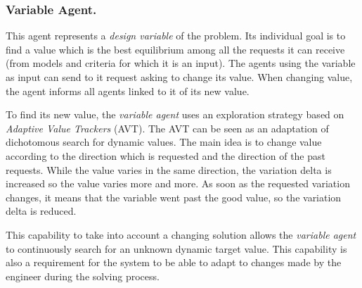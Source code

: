 \subsubsection*{Variable Agent.}

This agent represents a \emph{design variable} of the problem. Its individual goal is to find a value which is the best equilibrium among all the requests it can receive (from models and criteria for which it is an input). The agents using the variable as input can send to it request asking to change its value. When changing value, the agent informs all agents linked to it of its new value. 


To find its new value, the \emph{variable agent} uses an exploration strategy based on \emph{Adaptive Value Trackers} (AVT)\cite{Lemouzy_2011}. The AVT can be seen as an adaptation of dichotomous search for dynamic values. The main idea is to change value according to the direction which is requested and the direction of the past requests. While the value varies in the same direction, the variation delta is increased so the value varies more and more. As soon as the requested variation changes, it means that the variable went past the good value, so the variation delta is reduced.


This capability to take into account a changing solution allows the \emph{variable agent} to continuously search for an unknown dynamic target value. This capability is also a requirement for the system to be able to adapt to changes made by the engineer during the solving process.

